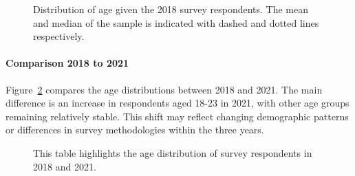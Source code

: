 \documentclass[
  letterpaper,
  DIV=11,
  numbers=noendperiod]{scrartcl}
\let\oldparagraph\paragraph
\renewcommand{\paragraph}[1]{\oldparagraph{#1}\mbox{}}
\begin{document}
\begin{figure}


\caption{\label{fig-one}Distribution of age given the 2018 survey
respondents. The mean and median of the sample is indicated with dashed
and dotted lines respectively.}

\end{figure}%

\newpage

\paragraph{Comparison 2018 to 2021}\label{comparison-2018-to-2021}

Figure~\ref{fig-two} compares the age distributions between 2018 and
2021. The main difference is an increase in respondents aged 18-23 in
2021, with other age groups remaining relatively stable. This shift may
reflect changing demographic patterns or differences in survey
methodologies within the three years.

\begin{figure}


\caption{\label{fig-two}This table highlights the age distribution of
survey respondents in 2018 and 2021.}

\end{figure}%
\end{document}
